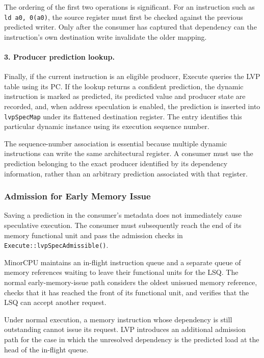 The ordering of the first two operations is significant. For an
instruction such as \texttt{ld a0, 0(a0)}, the source register must
first be checked against the previous predicted writer. Only
after the consumer has captured that dependency can the instruction's
own destination write invalidate the older mapping.

\paragraph{3. Producer prediction lookup.}
Finally, if the current instruction is an eligible producer,
Execute queries the LVP table using its PC. If the lookup returns a
confident prediction, the dynamic instruction is marked as predicted,
its predicted value and producer state are recorded, and, when
address speculation is enabled, the prediction is inserted into
\texttt{lvpSpecMap} under its flattened destination register. The
entry identifies this particular dynamic instance using its execution
sequence number.

The sequence-number association is essential because multiple
dynamic instructions can write the same architectural register.
A consumer must use the prediction belonging to the exact producer
identified by its dependency information, rather than an arbitrary
prediction associated with that register.

\subsubsection{Admission for Early Memory Issue}

Saving a prediction in the consumer's metadata does not immediately
cause speculative execution. The consumer must subsequently reach
the end of its memory functional unit and pass the admission checks
in \texttt{Execute::lvpSpecAdmissible()}.

MinorCPU maintains an in-flight instruction queue and a separate
queue of memory references waiting to leave their functional units
for the LSQ. The normal early-memory-issue path considers the
oldest unissued memory reference, checks that it has reached the
front of its functional unit, and verifies that the LSQ can accept
another request.

Under normal execution, a memory instruction whose dependency is
still outstanding cannot issue its request. LVP introduces an
additional admission path for the case in which the unresolved
dependency is the predicted load at the head of the in-flight
queue.

